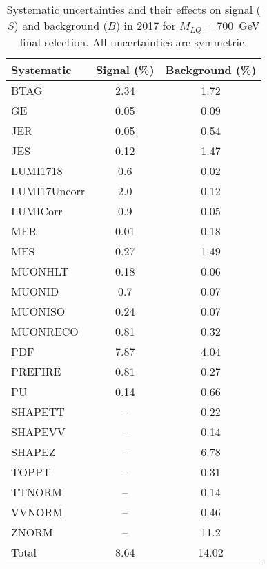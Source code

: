 \begin{table}[htbp]
\begin{center}
\caption{Systematic uncertainties and their effects on signal ($S$) and background ($B$) in 2017 for $M_{LQ}=700$~GeV final selection. All uncertainties are symmetric.}
\begin{tabular}{lcc}
\hline\hline
Systematic & Signal (\%) & Background (\%) \\ \hline 
BTAG & 2.34 & 1.72\\ 
GE & 0.05 & 0.09\\ 
JER & 0.05 & 0.54\\ 
JES & 0.12 & 1.47\\ 
LUMI1718 & 0.6 & 0.02\\ 
LUMI17Uncorr & 2.0 & 0.12\\ 
LUMICorr & 0.9 & 0.05\\ 
MER & 0.01 & 0.18\\ 
MES & 0.27 & 1.49\\ 
MUONHLT & 0.18 & 0.06\\ 
MUONID & 0.7 & 0.07\\ 
MUONISO & 0.24 & 0.07\\ 
MUONRECO & 0.81 & 0.32\\ 
PDF & 7.87 & 4.04\\ 
PREFIRE & 0.81 & 0.27\\ 
PU & 0.14 & 0.66\\ 
SHAPETT & -- & 0.22\\ 
SHAPEVV & -- & 0.14\\ 
SHAPEZ & -- & 6.78\\ 
TOPPT & -- & 0.31\\ 
TTNORM & -- & 0.14\\ 
VVNORM & -- & 0.46\\ 
ZNORM & -- & 11.2\\ 
Total & 8.64 & 14.02\\ \hline \hline
\end{tabular}
\label{tab:SysUncertainties_uujj_700}
\end{center}
\end{table}

